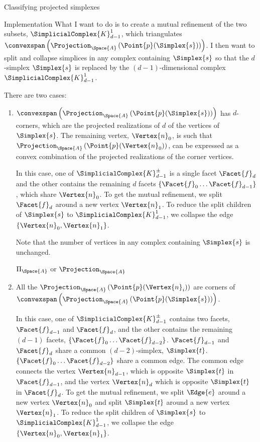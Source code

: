 \begin{plSection}{Classifying projected simplexes}
\begin{plSection}{Implementation}
What I want to do is to create a mutual refinement of the two subsets,
$\SimplicialComplex{K}_{d-1}^{1}$,
which triangulates
$\convexspan \left( \Projection_{\Space{A}} \left( \Point{p} ( \Simplex{s} ) \right) \right)$.
I then want to split and collapse simplices in any complex containing $\Simplex{s}$
so that the $d$-simplex $\Simplex{s}$ is replaced by the $(d-1)$-dimensional
complex $\SimplicialComplex{K}_{d-1}^{1}$.

There are two cases:
\begin{enumerate}

\item $\convexspan \left( \Projection_{\Space{A}} \left( \Point{p} ( \Simplex{s} ) \right) \right)$
has $d$-corners, which are the projected realizations of $d$
of the vertices of $\Simplex{s}$.
The remaining vertex, $\Vertex{n}_0$,
is such that
$\Projection_{\Space{A}} \left( \Point{p} ( \Vertex{n}_0 ) \right)$,
can be expressed
as a convex combination of the projected realizations of the corner vertices.

In this case, one of $\SimplicialComplex{K}_{d-1}^{\pm}$ is a single facet $\Facet{f}_d$
and the other contains the remaining $d$ facets $\{\Facet{f}_0 \ldots \Facet{f}_{d-1} \}$,
which share $\Vertex{n}_0$.
To get the mutual refinement, we split $\Facet{f}_d$ around a new vertex $\Vertex{n}_1$.
To reduce the split children of $\Simplex{s}$ to $\SimplicialComplex{K}_{d-1}^{1}$,
we collapse the edge $\{ \Vertex{n}_0 , \Vertex{n}_1 \}$.

Note that the number of vertices in any complex containing $\Simplex{s}$
is unchanged.

$\Pi_{\Space{A}}$ or $\Projection_{\Space{A}}$

\item All the $\Projection_{\Space{A}} \left( \Point{p} ( \Vertex{n}_i ) \right) $
are corners of
$\convexspan \left( \Projection_{\Space{A}} \left( \Point{p} ( \Simplex{s} ) \right) \right)$.

In this case, one of $\SimplicialComplex{K}_{d-1}^{\pm}$
contains two facets, $\Facet{f}_{d-1}$ and $\Facet{f}_{d}$,
and the other contains the remaining $(d-1)$ facets, $\{\Facet{f}_0 \ldots \Facet{f}_{d-2} \}$.
$\Facet{f}_{d-1}$ and $\Facet{f}_{d}$ share a common $(d-2)$-simplex, $\Simplex{t}$.
$\{\Facet{f}_0 \ldots \Facet{f}_{d-2} \}$ share a common edge.
The common edge connects the vertex $\Vertex{n}_{d-1}$,
which is opposite $\Simplex{t}$ in $\Facet{f}_{d-1}$,
and the vertex $\Vertex{n}_{d}$
which is opposite $\Simplex{t}$ in $\Facet{f}_{d}$.
To get the mutual refinement, we split $\Edge{e}$ around a new vertex $\Vertex{n}_0$
and split $\Simplex{t}$ around a new vertex $\Vertex{n}_1$.
To reduce the split children of $\Simplex{s}$ to $\SimplicialComplex{K}_{d-1}^{1}$,
we collapse the edge $\{ \Vertex{n}_0 , \Vertex{n}_1 \}$.


\end{enumerate}
\end{plSection}
\end{plSection}

